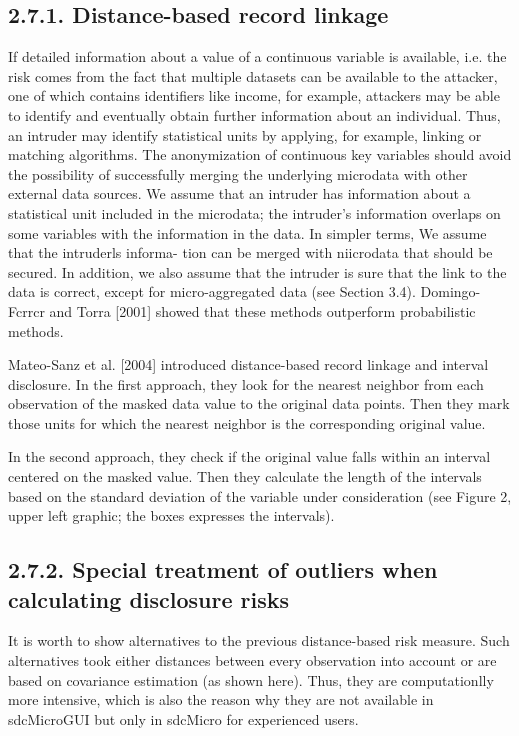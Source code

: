 \documentclass[]{article}
\begin{document}
\subsection*{2.7.1. Distance-based record linkage}
If detailed information about a value of a continuous variable is available, i.e. the
risk comes from the fact that multiple datasets can be available to the attacker,
one of which contains identiﬁers like income, for example, attackers may be able
to identify and eventually obtain further information about an individual. Thus,
an intruder may identify statistical units by applying, for example, linking or
matching algorithms. The anonymization of continuous key variables should avoid
the possibility of successfully merging the underlying microdata with other external
data sources.
We assume that an intruder has information about a statistical unit included
in the microdata; the intruder’s information overlaps on some variables with the
information in the data. In simpler terms, We assume that the intruderls informa-
tion can be merged with niicrodata that should be secured. In addition, we also
assume that the intruder is sure that the link to the data is correct, except for
micro-aggregated data (see Section 3.4). Domingo-Fcrrcr and Torra [2001] showed
that these methods outperform probabilistic methods.

Mateo-Sanz et al. [2004] introduced distance-based record linkage and interval
disclosure. In the ﬁrst approach, they look for the nearest neighbor from each
observation of the masked data value to the original data points. Then they mark
those units for which the nearest neighbor is the corresponding original value.

In the second approach, they check if the original value falls within an interval
centered on the masked value. Then they calculate the length of the intervals
based on the standard deviation of the variable under consideration (see Figure 2,
upper left graphic; the boxes expresses the intervals).
\subsection*{2.7.2. Special treatment of outliers when calculating disclosure risks}

It is worth to show alternatives to the previous distance-based risk measure. Such
alternatives took either distances between every observation into account or are
based on covariance estimation (as shown here). Thus, they are computationlly
more intensive, which is also the reason why they are not available in sdcMicroGUI
but only in sdcMicro for experienced users.
\end{document}
